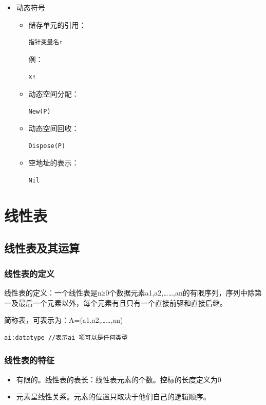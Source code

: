 \documentclass[AutoFakeBold]{LZUThesis2007}
\begin{document}
\begin{enumerate}
\begin{itemize}
	\item 动态符号
\begin{itemize}
	\item 储存单元的引用：
\begin{lstlisting}
指针变量名↑
\end{lstlisting}
例：
\begin{lstlisting}
x↑
\end{lstlisting}
	\item 动态空间分配：
\begin{lstlisting}
New(P)
\end{lstlisting}
	\item 动态空间回收：
\begin{lstlisting}
Dispose(P)
\end{lstlisting}
	\item 空地址的表示：
\begin{lstlisting}
Nil
\end{lstlisting}
\end{itemize}
\end{itemize}
			\end{enumerate}

\chapter{线性表}
	\section{线性表及其运算}
		\subsection{线性表的定义}
		线性表的定义：一个线性表是n≥0个数据元素a1,a2,……,an的有限序列，序列中除第一及最后一个元素以外，每个元素有且只有一个直接前驱和直接后继。

		简称表，可表示为：A=(a1,a2,……,an)
\begin{lstlisting}
ai:datatype	//表示ai 项可以是任何类型
\end{lstlisting}

		\subsection{线性表的特征}
			\begin{itemize}
				\item 有限的。线性表的表长：线性表元素的个数。控标的长度定义为0
				\item 元素呈线性关系。元素的位置只取决于他们自己的逻辑顺序。
			\end{itemize}
\end{document}

